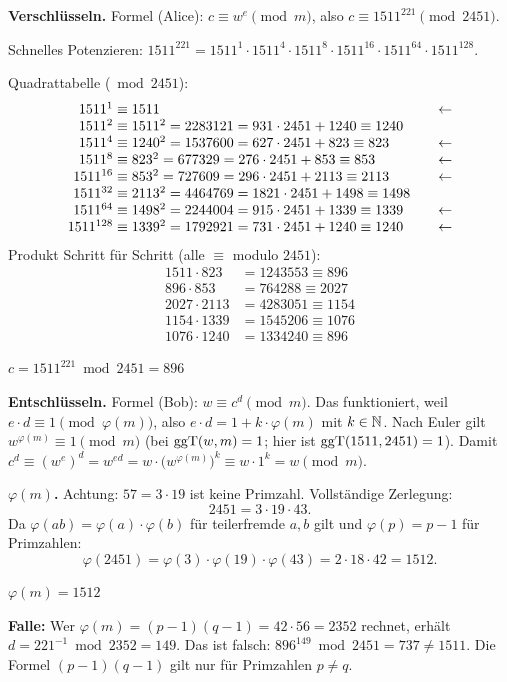 \textbf{Verschlüsseln.} Formel (Alice): $c \equiv w^e \pmod m$, also $c \equiv 1511^{221} \pmod{2451}$.

Schnelles Potenzieren: $1511^{221} = 1511^{1} \cdot 1511^{4} \cdot 1511^{8} \cdot 1511^{16} \cdot 1511^{64} \cdot 1511^{128}$.

Quadrattabelle ($\bmod 2451$):
\[
\begin{array}{r@{\;\equiv\;}l@{\qquad}l}
1511^{1}   & 1511 & \leftarrow\\
1511^{2}   & 1511^2 = 2283121 = 931 \cdot 2451 + 1240 \equiv 1240 & \\
1511^{4}   & 1240^2 = 1537600 = 627 \cdot 2451 + 823 \equiv 823 & \leftarrow\\
1511^{8}   & 823^2 = 677329 = 276 \cdot 2451 + 853 \equiv 853 & \leftarrow\\
1511^{16}  & 853^2 = 727609 = 296 \cdot 2451 + 2113 \equiv 2113 & \leftarrow\\
1511^{32}  & 2113^2 = 4464769 = 1821 \cdot 2451 + 1498 \equiv 1498 & \\
1511^{64}  & 1498^2 = 2244004 = 915 \cdot 2451 + 1339 \equiv 1339 & \leftarrow\\
1511^{128} & 1339^2 = 1792921 = 731 \cdot 2451 + 1240 \equiv 1240 & \leftarrow
\end{array}
\]
Produkt Schritt für Schritt (alle $\equiv$ modulo $2451$):
\begin{align*}
1511 \cdot 823 &= 1243553 \equiv 896\\
896 \cdot 853 &= 764288 \equiv 2027\\
2027 \cdot 2113 &= 4283051 \equiv 1154\\
1154 \cdot 1339 &= 1545206 \equiv 1076\\
1076 \cdot 1240 &= 1334240 \equiv 896
\end{align*}
\begin{ergebnis} $c = 1511^{221} \bmod 2451 = 896$ \end{ergebnis}

 \textbf{Entschlüsseln.} Formel (Bob): $w \equiv c^d \pmod m$.
Das funktioniert, weil $e \cdot d \equiv 1 \pmod{\varphi(m)}$, also $e \cdot d = 1 + k \cdot \varphi(m)$ mit $k \in \mathbb{N}$.
Nach Euler gilt $w^{\varphi(m)} \equiv 1 \pmod m$ (bei $\operatorname{ggT}(w, m) = 1$; hier ist $\operatorname{ggT}(1511, 2451) = 1$). Damit
$c^d \equiv (w^e)^d = w^{ed} = w \cdot \bigl(w^{\varphi(m)}\bigr)^k \equiv w \cdot 1^k = w \pmod m$.

 \textbf{$\varphi(m)$.} Achtung: $57 = 3 \cdot 19$ ist keine Primzahl. Vollständige Zerlegung:
\[
2451 = 3 \cdot 19 \cdot 43 .
\]
Da $\varphi(ab) = \varphi(a) \cdot \varphi(b)$ für teilerfremde $a, b$ gilt und $\varphi(p) = p - 1$ für Primzahlen:
\[
\varphi(2451) = \varphi(3) \cdot \varphi(19) \cdot \varphi(43) = 2 \cdot 18 \cdot 42 = 1512 .
\]
\begin{ergebnis} $\varphi(m) = 1512$ \end{ergebnis}
\begin{achtung}
\textbf{Falle:} Wer $\varphi(m) = (p-1)(q-1) = 42 \cdot 56 = 2352$ rechnet, erhält $d = 221^{-1} \bmod 2352 = 149$.
Das ist falsch: $896^{149} \bmod 2451 = 737 \neq 1511$. Die Formel $(p-1)(q-1)$ gilt nur für Primzahlen $p \neq q$.
\end{achtung}

